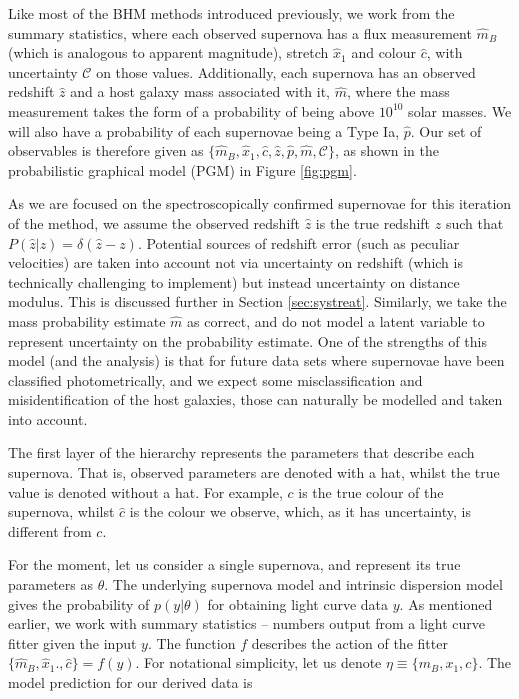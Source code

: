 \documentclass[a4paper,fleqn,usenatbib]{mnras}
\newcommand{\cov}{\mathcal{C}}
\newcommand{\rubin}{\citetalias{Rubin2015}}
\begin{document}
Like most of the BHM methods introduced previously, we work from the summary statistics, where each observed supernova has a flux measurement $\hat{m}_B$ (which is analogous to apparent magnitude), stretch $\hat{x}_1$ and colour $\hat{c}$, with uncertainty $\cov$ on those values. Additionally, each supernova has an observed redshift $\hat{z}$ and a host galaxy mass associated with it, $\hat{m}$, where the mass measurement takes the form of a probability of being above $10^{10}$ solar masses. We will also have a probability of each supernovae being a Type Ia, $\hat{p}$. Our set of observables is therefore given as $\lbrace \hat{m}_B, \hat{x}_1, \hat{c}, \hat{z}, \hat{p}, \hat{m}, \cov \rbrace$, as shown in the probabilistic graphical model (PGM) in Figure \ref{fig:pgm}.


As we are focused on the spectroscopically confirmed supernovae for this iteration of the method, we assume the observed redshift $\hat{z}$ is the true redshift $z$ such that $P(\hat{z}|z) = \delta(\hat{z} - z)$. Potential sources of redshift error (such as peculiar velocities) are taken into account not via uncertainty on redshift (which is technically challenging to implement) but instead uncertainty on distance modulus. This is discussed further in Section \ref{sec:systreat}. Similarly, we take the mass probability estimate $\hat{m}$ as correct, and do not model a latent variable to represent uncertainty on the probability estimate. One of the strengths of this model (and the {\rubin} analysis) is that for future data sets where supernovae have been classified photometrically, and we expect some misclassification and misidentification of the host galaxies, those can naturally be modelled and taken into account.

The first layer of the hierarchy represents the parameters that describe each supernova. That is, observed parameters are denoted with a hat, whilst the true value is denoted without a hat. For example, $c$ is the true colour of the supernova, whilst $\hat{c}$ is the colour we observe, which, as it has uncertainty, is different from $c$.

For the moment, let us consider a single supernova, and represent its true parameters as $\theta$. The underlying supernova model and intrinsic dispersion model gives the probability of $p(y|\theta)$ for obtaining light curve data $y$. As mentioned earlier, we work with summary statistics -- numbers output from a light curve fitter given the input $y$. The function $f$ describes the action of the fitter $\lbrace \hat{m}_B, \hat{x}_1., \hat{c} \rbrace = f(y)$. For notational simplicity, let us denote $\eta \equiv \lbrace m_B, x_1, c \rbrace$. The model prediction for our derived data is
\end{document}
